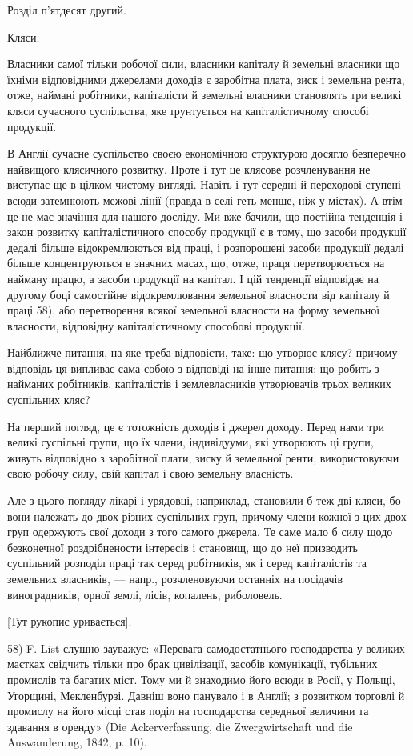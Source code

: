 Розділ п’ятдесят другий.

Кляси.

Власники самої тільки робочої сили, власники капіталу й земельні власники
що їхніми відповідними джерелами доходів є заробітна плата, зиск і земельна рента,
отже, наймані робітники, капіталісти й земельні власники становлять три великі
кляси сучасного суспільства, яке ґрунтується на капіталістичному способі
продукції.

В Англії сучасне суспільство своєю економічною структурою досягло безперечно
найвищого клясичного розвитку. Проте і тут це клясове розчленування не
виступає ще в цілком чистому вигляді. Навіть і тут середні й переходові ступені
всюди затемнюють межові лінії (правда в селі геть менше, ніж у містах).
А втім це не має значіння для нашого досліду. Ми вже бачили, що постійна
тенденція і закон розвитку капіталістичного способу продукції є в тому, що
засоби продукції дедалі більше відокремлюються від праці, і розпорошені засоби
продукції дедалі більше концентруються в значних масах, що, отже, праця
перетворюється на найману працю, а засоби продукції на капітал. І цій тенденції
відповідає на другому боці самостійне відокремлювання земельної власности
від капіталу й праці 58), або перетворення всякої земельної власности на форму
земельної власности, відповідну капіталістичному способові продукції.

Найближче питання, на яке треба відповісти, таке: що утворює клясу?
причому відповідь ця випливає сама собою з відповіді на інше питання: що
робить з найманих робітників, капіталістів і землевласників утворювачів трьох
великих суспільних кляс?

На перший погляд, це є тотожність доходів і джерел доходу. Перед нами
три великі суспільні групи, що їх члени, індивідууми, які утворюють ці групи,
живуть відповідно з заробітної плати, зиску й земельної ренти, використовуючи
свою робочу силу, свій капітал і свою земельну власність.

Але з цього погляду лікарі і урядовці, наприклад, становили б теж дві
кляси, бо вони належать до двох різних суспільних груп, причому члени кожної
з цих двох груп одержують свої доходи з того самого джерела. Те саме мало б
силу щодо безконечної роздрібнености інтересів і становищ, що до неї призводить
суспільний розподіл праці так серед робітників, як і серед капіталістів та
земельних власників, — напр., розчленовуючи останніх на посідачів виноградників,
орної землі, лісів, копалень, риболовель.

[Тут рукопис уривається].

58) F. List слушно зауважує: «Перевага самодостатнього господарства у великих маєтках
свідчить тільки про брак цивілізації, засобів комунікації, тубільних промислів та багатих міст. Тому
ми й знаходимо його всюди в Росії, у Польщі, Угорщині, Мекленбурзі. Давніш воно панувало і в Англії;
з розвитком торговлі й промислу на його місці став поділ на господарства середньої величини та
здавання в оренду» (Die Ackerverfassung, die Zwergwirtschaft und die Auswanderung, 1842, p. 10).
